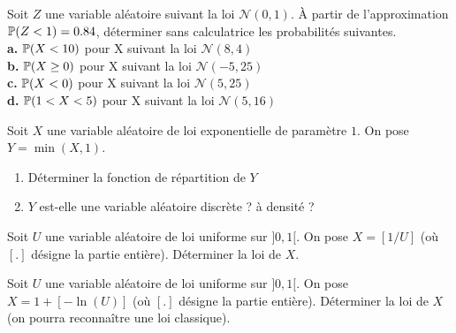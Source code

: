 \begin{exo}Soit $Z$ une variable aléatoire suivant la loi $\mathcal N(0,1)$. \`A partir de l'approximation $\P(Z<1)=0.84$, déterminer sans calculatrice les probabilités suivantes.\\
\noindent\textbf{a.} $\P(X<10)$ pour X suivant la loi $\mathcal N(8,4)$\\
\noindent\textbf{b.} $\P(X\geq 0)$ pour X suivant la loi $\mathcal N(-5,25)$\\
\noindent\textbf{c.} $\P(X<0)$ pour X suivant la loi $\mathcal N(5,25)$\\
\noindent\textbf{d.} $\P(1<X<5)$ pour X suivant la loi $\mathcal N(5,16)$\\
\end{exo}

\bigskip

\begin{exo}
Soit $X$ une variable al\'eatoire de loi exponentielle de param\`etre $1$. On pose $Y=\min (X,1)$. 
\begin{enumerate}
\item D\'eterminer la fonction de r\'epartition de $Y$
\item $Y$ est-elle une variable al\'eatoire discr\`ete ? \`a densit\'e ?
\end{enumerate}
\end{exo}

\bigskip

\begin{exo}
Soit $U$ une variable al\'eatoire de loi uniforme sur $]0,1[$.
On pose $X=[1/U]$ (o\`u $[.]$ d\'esigne la partie enti\`ere).
D\'eterminer la loi de $X$.
\end{exo}

\bigskip

\begin{exo}
Soit $U$ une variable al\'eatoire de loi uniforme sur $]0,1[$.
On pose $X=1+[- \ln(U)]$ (o\`u $[.]$ d\'esigne la partie enti\`ere).
D\'eterminer la loi de $X$ (on pourra reconna\^itre une loi classique).
\end{exo}

\bigskip

